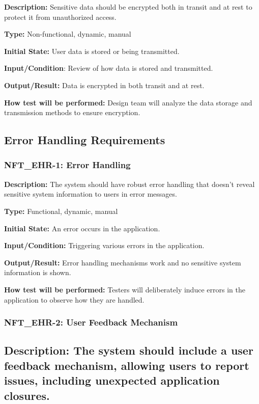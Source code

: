 \documentclass[12pt, titlepage]{article}
\begin{document}
\textbf{Description: }Sensitive data should be encrypted both in transit and at rest to protect it from unauthorized access.

\textbf{Type: }Non-functional, dynamic, manual

\textbf{Initial State: }User data is stored or being transmitted.

\textbf{Input/Condition}: Review of how data is stored and transmitted.

\textbf{Output/Result: }Data is encrypted in both transit and at rest.

\textbf{How test will be performed:} Design team will analyze the data storage and transmission methods to ensure encryption.
\newline
\subsection{Error Handling Requirements}


\subsubsection*{\textbf{NFT\_EHR-1: Error Handling}}


\textbf{Description: }The system should have robust error handling that doesn’t reveal sensitive system information to users in error messages.

\textbf{Type:} Functional, dynamic, manual

\textbf{Initial State:} An error occurs in the application.

\textbf{Input/Condition:} Triggering various errors in the application.

\textbf{Output/Result: }Error handling mechanisms work and no sensitive system information is shown.

\textbf{How test will be performed:} Testers will deliberately induce errors in the application to observe how they are handled.

\subsubsection*{\textbf{NFT\_EHR-2: User Feedback Mechanism}}

\subsection{\textbf{Description: }The system should include a user feedback mechanism, allowing users to report issues, including unexpected application closures.}
\end{document}
